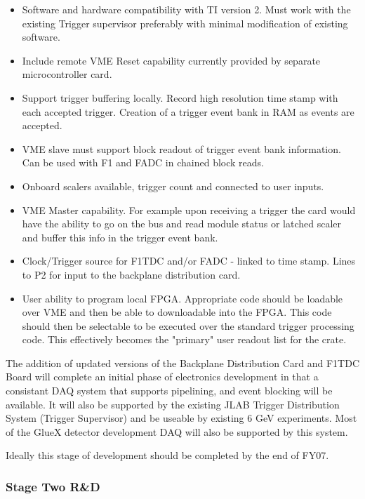 \documentclass[10pt]{article}
\begin{document}
\begin{itemize}
\item Software and hardware compatibility with TI version 2. Must work with the 
existing Trigger supervisor preferably with minimal modification of existing 
software.
\item Include remote VME Reset capability currently provided by separate 
microcontroller card.
\item Support trigger buffering locally. Record high resolution time stamp with 
each accepted trigger. Creation of a trigger event bank in RAM as events are 
accepted.
\item VME slave must support block readout of trigger event bank information. 
Can be used with F1 and FADC in chained block reads.
\item Onboard scalers available, trigger count and connected to user inputs.
\item VME Master capability. For example upon receiving a trigger the card would 
have the ability to go on the bus and read module status or latched scaler 
and buffer this info in the trigger event bank.
\item Clock/Trigger source for F1TDC and/or FADC - linked to time stamp. Lines to 
P2 for input to the backplane distribution card. 
\item User ability to program local FPGA. Appropriate code should be loadable 
over VME and then be able to downloadable into the FPGA. This code should 
then be selectable to be executed over the standard trigger processing code. 
This effectively becomes the "primary" user readout list for the crate.
\end{itemize}

The addition of updated versions of the Backplane Distribution Card and F1TDC Board 
will complete an initial phase of electronics development in that a consistant DAQ
system that supports pipelining, and event blocking will be available. It will also
be supported by the existing JLAB Trigger Distribution System (Trigger Supervisor) and
be useable by existing 6 GeV experiments. Most of the GlueX detector development DAQ
will also be supported by this system.

Ideally this stage of development should be completed by the end of FY07.


\subsubsection*{Stage Two R\&D}
\end{document}
